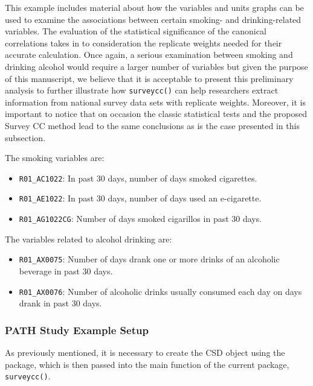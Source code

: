 This example includes material about how the variables and units graphs can be used to examine the associations between certain smoking- and drinking-related variables. The evaluation of the statistical significance of the canonical correlations takes in to consideration the replicate weights needed for their accurate calculation. Once again, a serious examination between smoking and drinking alcohol would require a larger number of variables but given the purpose of this manuscript, we believe that it is acceptable to present this preliminary analysis to further illustrate how \texttt{surveycc()} can help researchers extract information from national survey data sets with replicate weights. Moreover, it is important to notice that on occasion the classic statistical tests and the proposed Survey CC method lead to the same conclusions as is the case presented in this subsection.

The smoking variables are:

\begin{itemize}
\tightlist
\item
  \texttt{R01\_AC1022}: In past 30 days, number of days smoked cigarettes.
\item
  \texttt{R01\_AE1022}: In past 30 days, number of days used an e-cigarette.
\item
  \texttt{R01\_AG1022CG}: Number of days smoked cigarillos in past 30 days.
\end{itemize}

The variables related to alcohol drinking are:

\begin{itemize}
\tightlist
\item
  \texttt{R01\_AX0075}: Number of days drank one or more drinks of an alcoholic beverage in past 30 days.
\item
  \texttt{R01\_AX0076}: Number of alcoholic drinks usually consumed each day on days drank in past 30 days.
\end{itemize}

\hypertarget{path-study-example-setup}{%
\subsubsection{PATH Study Example Setup}\label{path-study-example-setup}}

As previously mentioned, it is necessary to create the CSD object using the  package, which is then passed into the main function of the current package, \texttt{surveycc()}.


